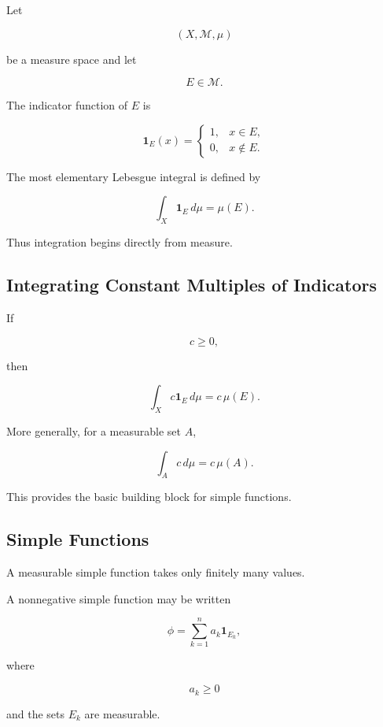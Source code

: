 Let

\[
(X,\mathcal{M},\mu)
\]

be a measure space and let

\[
E\in\mathcal{M}.
\]

The indicator function of \(E\) is

\[
\boxed{
\mathbf{1}_E(x)
=
\begin{cases}
1, & x\in E,\\
0, & x\notin E.
\end{cases}
}
\]

The most elementary Lebesgue integral is defined by

\[
\boxed{
\int_X \mathbf{1}_E\,d\mu
=
\mu(E).
}
\]

Thus integration begins directly from measure.

\subsection{Integrating Constant Multiples of Indicators}
\label{subsec:constant-indicator-integral}

If

\[
c\geq0,
\]

then

\[
\boxed{
\int_X c\mathbf{1}_E\,d\mu
=
c\,\mu(E).
}
\]

More generally, for a measurable set \(A\),

\[
\boxed{
\int_A c\,d\mu
=
c\,\mu(A).
}
\]

This provides the basic building block for simple functions.

\subsection{Simple Functions}
\label{subsec:simple-functions-lebesgue}

A measurable simple function takes only finitely many values.

A nonnegative simple function may be written

\[
\boxed{
\phi
=
\sum_{k=1}^{n}
a_k\mathbf{1}_{E_k},
}
\]

where

\[
a_k\geq0
\]

and the sets \(E_k\) are measurable.

